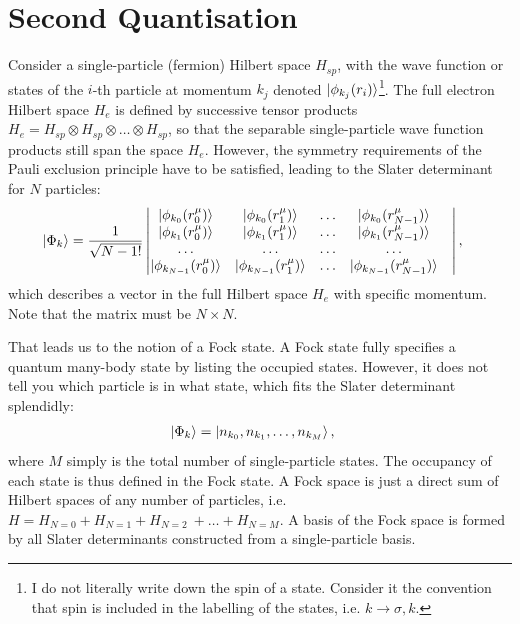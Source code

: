 \section{Second Quantisation}
\label{sec:secondquantisation}
Consider a single-particle (fermion) Hilbert space $H_{sp}$, with the wave function or states of the $i$-th particle at momentum $k_j$ denoted $\ket{\phi_{k_j}(r_i)}$\footnote{I do not literally write down the spin of a state. Consider it the convention that spin is included in the labelling of the states, i.e. $k \rightarrow \sigma, k$.}. The full electron Hilbert space $H_e$ is defined by successive tensor products $H_{e} = H_{sp} \otimes H_{sp} \otimes \ldots \otimes H_{sp}$, so that the separable single-particle wave function products still span the space $H_e$. However, the symmetry requirements of the Pauli exclusion principle have to be satisfied, leading to the Slater determinant for $N$ particles\cite{yuli}:
\begin{align}
\ket{\Phi_k} &= \frac{1}{\sqrt{{N-1}!}} \begin{vmatrix}
\ket{\phi_{k_0}(r_0^\mu)} & \ket{\phi_{k_0}(r_1^\mu)} &\ldots& \ket{\phi_{k_0}(r_{N-1}^\mu)} \\
\ket{\phi_{k_1}(r_0^\mu)} & \ket{\phi_{k_1}(r_1^\mu)} &\ldots& \ket{\phi_{k_1}(r_{N-1}^\mu)} \\
\ldots&\ldots&\ldots&\ldots&\\
\ket{\phi_{k_{N-1}}(r_0^\mu)} & \ket{\phi_{k_{N-1}}(r_1^\mu)} &\ldots& \ket{\phi_{k_{N-1}}(r_{N-1}^\mu)} \\
\end{vmatrix},
\label{eq:slaterdeterminant}
\end{align}
which describes a vector in the full Hilbert space $H_e$ with specific momentum. Note that the matrix must be $N\times N$. %

That leads us to the notion of a Fock state. A Fock state fully specifies a quantum many-body state by listing the occupied states. However, it does not tell you which particle is in what state, which fits the Slater determinant splendidly:
\begin{align}
\ket{\Phi_k} &= \ket{n_{k_0}, n_{k_1},\ldots, n_{k_M}},
\label{eq:fock}
\end{align}
where $M$ simply is the total number of single-particle states. The occupancy of each state is thus defined in the Fock state. A Fock space is just a direct sum of Hilbert spaces of any number of particles, i.e. $H = H_{N=0} + H_{N=1} + H_{N=2}\ + \ldots + H_{N=M}$. A basis of the Fock space is formed by all Slater determinants constructed from a single-particle basis. 


